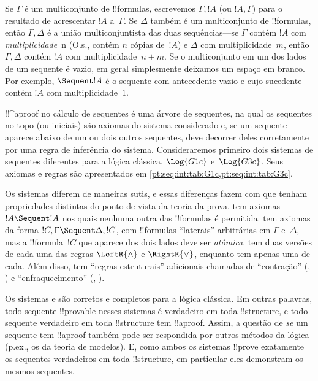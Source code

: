 \documentclass[../../../include/open-logic-section]{subfiles}
\begin{document}
Se $\Gamma$ é um multiconjunto de !!{formula}s, escrevemos $\Gamma, !A$
(ou $!A, \Gamma$) para o resultado de acrescentar $!A$ a~$\Gamma$. Se
$\Delta$ também é um multiconjunto de !!{formula}s, então $\Gamma, \Delta$
é a união multiconjuntista das duas sequências---se $\Gamma$ contém $!A$
com \emph{multiplicidade}~n (O.s.\@, contém $n$ cópias de~$!A$) e $\Delta$
com multiplicidade~$m$, então $\Gamma, \Delta$ contém $!A$ com
multiplicidade~$n+m$. Se o multiconjunto em um dos lados de um sequente é
vazio, em geral simplesmente deixamos um espaço em branco. Por exemplo,
$\Sequent !A$ é o sequente com antecedente vazio e cujo sucedente contém
$!A$ com multiplicidade~$1$.

!!^a{proof} no cálculo de sequentes é uma árvore de sequentes, na qual os
sequentes no topo (ou iniciais) são axiomas do sistema considerado e, se um
sequente aparece abaixo de um ou dois outros sequentes, deve decorrer deles
corretamente por uma regra de inferência do sistema. Consideraremos primeiro
dois sistemas de sequentes diferentes para a lógica clássica, $\Log{G1c}$
e~$\Log{G3c}$. Seus axiomas e regras são apresentados em
\cref{pt:seq:int:tab:G1c,pt:seq:int:tab:G3c}. 




Os sistemas diferem de maneiras sutis, e essas diferenças fazem com que
tenham propriedades distintas do ponto de vista da teoria da prova.
 tem axiomas $!A \Sequent !A$ nos quais nenhuma outra das
!!{formula}s é permitida.  tem axiomas da forma
$!C, \Gamma \Sequent \Delta, !C$, com !!{formula}s ``laterais'' arbitrárias
em $\Gamma$ e~$\Delta$, mas a !!{formula}~$!C$ que aparece dos dois lados
deve ser \emph{atômica}.  tem duas versões de cada uma das regras
$\LeftR{\land}$ e $\RightR{\lor}$, enquanto  tem apenas uma de
cada. Além disso,  tem ``regras estruturais'' adicionais chamadas
de ``contração'' (\LeftR{\Contraction}, \RightR{\Contraction}) e
``enfraquecimento'' (\LeftR{\Weakening}, \RightR{\Weakening}).

Os sistemas  e  são corretos e completos para a lógica
clássica. Em outras palavras, todo sequente !!{provable} nesses sistemas é
verdadeiro em toda !!{structure}, e todo sequente verdadeiro em toda
!!{structure} tem !!a{proof}. Assim, a questão de \emph{se} um sequente tem
!!a{proof} também pode ser respondida por outros métodos da lógica (p.ex., os da teoria de modelos). E, como ambos os sistemas !!{prove}
exatamente os sequentes verdadeiros em toda !!{structure}, em particular
eles demonstram os mesmos sequentes.
\end{document}
